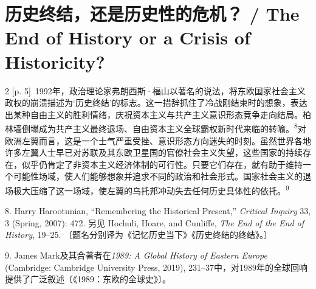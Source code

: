 \documentclass[10pt,a4paper]{article}
\begin{document}
\section*{历史终结，还是历史性的危机？ / The End of History or a Crisis of Historicity?}
\begin{paracol}{2}
{\scriptsize\color{gray} [p. 5]}\ 1992年，政治理论家弗朗西斯·福山以著名的说法，将东欧国家社会主义政权的崩溃描述为‘历史终结’的标志。这一措辞抓住了冷战刚结束时的想象，表达出某种自由主义的胜利情绪，庆祝资本主义与共产主义意识形态竞争走向结局。柏林墙倒塌成为共产主义最终退场、自由资本主义全球霸权新时代来临的转\mbox{喻。\textsuperscript{8}}对欧洲左翼而言，这是一个士气严重受挫、意识形态方向迷失的时刻。虽然世界各地许多左翼人士早已对苏联及其东欧卫星国的官僚社会主义失望，这些国家的持续存在，似乎仍肯定了非资本主义经济体制的可行性。只要它们存在，就有助于维持一个可能性场域，使人们能够想象并追求不同的政治和社会形式。国家社会主义的退场极大压缩了这一场域，使左翼的乌托邦冲动失去任何历史具体性的依\mbox{托。\textsuperscript{9}}\par{\small 8. Harry Harootunian, “Remembering the Historical Present,” \textit{Critical Inquiry} 33, 3 (Spring, 2007): 472. 另见 Hochuli, Hoare, and Cunliffe, \textit{The End of the End of History}, 19–25. 〔题名分别译为《记忆历史当下》《历史终结的终结》。〕\par}{\small 9. James Mark及其合著者在\textit{1989: A Global History of Eastern Europe} (Cambridge: Cambridge University Press, 2019), 231–37中，对1989年的全球回响提供了广泛叙述〔《1989：东欧的全球史》〕。\par}
\switchcolumn

\end{paracol}
\end{document}
